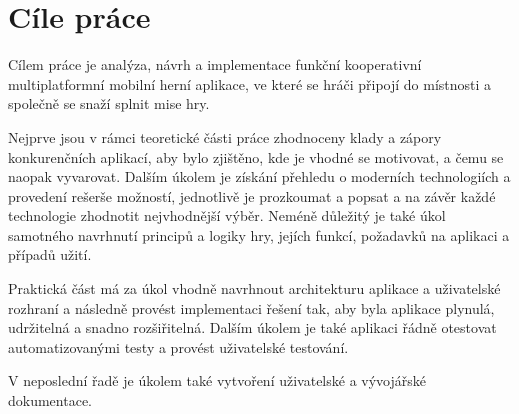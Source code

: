 \chapter{Cíle práce}

Cílem práce je analýza, návrh a implementace funkční
kooperativní multiplatformní mobilní herní aplikace,
ve které se hráči připojí do místnosti a společně se snaží splnit mise hry.

Nejprve jsou v rámci teoretické části práce zhodnoceny klady a zápory
konkurenčních aplikací,
aby bylo zjištěno,
kde je vhodné se motivovat, a čemu se naopak vyvarovat.
Dalším úkolem je získání přehledu o moderních technologiích
a provedení rešerše možností, jednotlivě je prozkoumat a popsat
a na závěr každé technologie zhodnotit nejvhodnější výběr.
Neméně důležitý je také úkol samotného navrhnutí principů a logiky hry,
jejích funkcí, požadavků na aplikaci a případů užití.

Praktická část má za úkol vhodně navrhnout architekturu aplikace
a uživatelské rozhraní a následně provést implementaci řešení tak,
aby byla aplikace plynulá, udržitelná a snadno rozšiřitelná.
Dalším úkolem je také aplikaci řádně otestovat automatizovanými testy 
a provést uživatelské testování.

V neposlední řadě je úkolem také vytvoření uživatelské a vývojářské
dokumentace.
